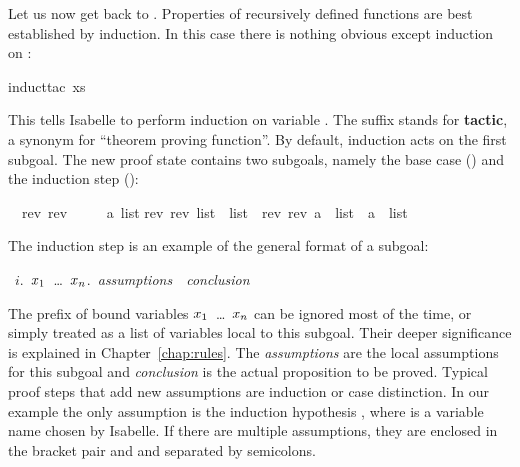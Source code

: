 \begin{isabellebody}
\begin{isamarkuptxt}
Let us now get back to . Properties of recursively
defined functions are best established by induction. In this case there is
nothing obvious except induction on :%
\end{isamarkuptxt}%
induct{\isacharunderscore}tac\ xs{\isacharparenright}%
\begin{isamarkuptxt}%
\noindent{}%
This tells Isabelle to perform induction on variable . The suffix
 stands for \textbf{tactic},
a synonym for ``theorem proving function''.
By default, induction acts on the first subgoal. The new proof state contains
two subgoals, namely the base case () and the induction step
():
\begin{isabelle}%
\ {}{\isachardot}\ rev\ {\isacharparenleft}rev\ {\isacharbrackleft}{\isacharbrackright}{\isacharparenright}\ {\isacharequal}\ {\isacharbrackleft}{\isacharbrackright}\isanewline
\ {}{\isachardot}\ {\isasymAnd}a\ list{\isachardot}\isanewline
{}rev\ {\isacharparenleft}rev\ list{\isacharparenright}\ {\isacharequal}\ list\ {\isasymLongrightarrow}\ rev\ {\isacharparenleft}rev\ {\isacharparenleft}a\ {\isacharhash}\ list{\isacharparenright}{\isacharparenright}\ {\isacharequal}\ a\ {\isacharhash}\ list%
\end{isabelle}

The induction step is an example of the general format of a subgoal:
\begin{isabelle}
~$i$.~{\isasymAnd}$x\sb{1}$~\dots~$x\sb{n}$.~{\it assumptions}~{\isasymLongrightarrow}~{\it conclusion}
\end{isabelle}
The prefix of bound variables \isasymAnd$x\sb{1}$~\dots~$x\sb{n}$ can be
ignored most of the time, or simply treated as a list of variables local to
this subgoal. Their deeper significance is explained in Chapter~\ref{chap:rules}.
The {\it assumptions} are the local assumptions for this subgoal and {\it
  conclusion} is the actual proposition to be proved. Typical proof steps
that add new assumptions are induction or case distinction. In our example
the only assumption is the induction hypothesis , where  is a variable name chosen by Isabelle. If there
are multiple assumptions, they are enclosed in the bracket pair
 and
 and separated by semicolons.


\end{isamarkuptxt}
\end{isabellebody}
